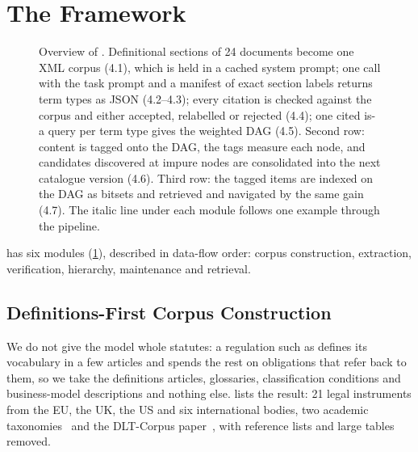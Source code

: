 \section{The \sys Framework}
\label{sec:method}

\begin{figure}[t]
  \centering
  
  \caption{Overview of \sys. Definitional sections of 24 documents become one
  XML corpus (4.1), which is held in a cached system prompt; one call with the
  task prompt and a manifest of exact section labels returns term types as JSON
  (4.2--4.3); every citation is checked against the corpus and either accepted,
  relabelled or rejected (4.4); one cited is-a query per term type gives the
  weighted DAG (4.5). Second row: content is tagged onto the DAG, the tags
  measure each node, and candidates discovered at impure nodes are consolidated
  into the next catalogue version (4.6). Third row: the tagged items are
  indexed on the DAG as bitsets and retrieved and navigated by the same gain
  (4.7). The italic line under each module follows one example through the
  pipeline.}
  \label{fig:overview}
\end{figure}

\sys has six modules (\cref{fig:overview}), described in data-flow order:
corpus construction, extraction, verification, hierarchy, maintenance and
retrieval.

\subsection{Definitions-First Corpus Construction}
\label{sec:method:corpus}

We do not give the model whole statutes: a regulation such as 
defines its vocabulary in a few articles and spends the rest on obligations
that refer back to them, so we take the definitions articles, glossaries,
classification conditions and business-model descriptions and nothing else.  lists the result: 21 legal
instruments from the EU, the UK, the US and six international bodies, two
academic taxonomies~\cite{tasca2019taxonomy,zhang2026cryptotaxonomy} and the
DLT-Corpus paper~\cite{hernandez2026dltcorpus}, with reference lists and
large tables removed.

\begin{table}[t]
  \centering
  \caption{\corpus: the 24 source documents, the sections kept from each,
  their length in thousands of words, and the number of term types that cite
  each document in the run of \cref{sec:exp:rq1}.}
  \label{tab:corpus}
  \scriptsize
  
\end{table}

